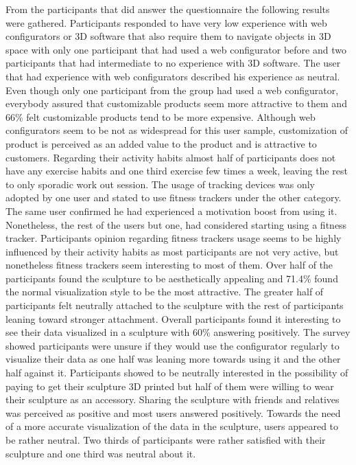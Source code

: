 \documentclass[../medieninformatik-arbeit.tex]{subfiles}
\begin{document}
From the participants that did answer the questionnaire the following results were gathered. Participants responded to have very low experience with web configurators or 3D software that also require them to navigate objects in 3D space with only one participant that had used a web configurator before and two participants that had intermediate to no experience with 3D software. The user that had experience with web configurators described his experience as neutral. Even though only one participant from the group had used a web configurator, everybody assured that customizable products seem more attractive to them and 66\% felt customizable products tend to be more expensive. Although web configurators seem to be not as widespread for this user sample, customization of product is perceived as an added value to the product and is attractive to customers. 
Regarding their activity habits almost half of participants does not have any exercise habits and one third exercise few times a week, leaving the rest to only sporadic work out session. The usage of tracking devices was only adopted by one user and stated to use fitness trackers under the other category. The same user confirmed he had experienced a motivation boost from using it. Nonetheless, the rest of the users but one, had considered starting using a fitness tracker. Participants opinion regarding fitness trackers usage seems to be highly influenced by their activity habits as most participants are not very active, but nonetheless fitness trackers seem interesting to most of them. 
Over half of the participants found the sculpture to be aesthetically appealing and 71.4\% found the normal visualization style to be the most attractive. The greater half of participants felt neutrally attached to the sculpture with the rest of participants leaning toward stronger attachment. Overall participants found it interesting to see their data visualized in a sculpture with 60\% answering positively. The survey showed participants were unsure if they would use the configurator regularly to visualize their data as one half was leaning more towards using it and the other half against it. Participants showed to be neutrally interested in the possibility of paying to get their sculpture 3D printed but half of them were willing to wear their sculpture as an accessory. Sharing the sculpture with friends and relatives was perceived as positive and most users answered positively. Towards the need of a more accurate visualization of the data in the sculpture, users appeared to be rather neutral. Two thirds of participants were rather satisfied with their sculpture and one third was neutral about it. 
\end{document}
